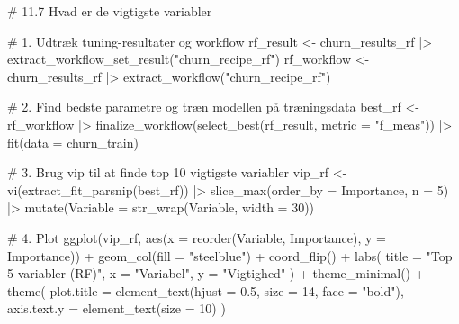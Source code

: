 \documentclass[
  11pt,
  letterpaper,
  DIV=11,
  numbers=noendperiod]{scrartcl}
\newenvironment{Shaded}{\begin{snugshade}}{\end{snugshade}}
\newcommand{\AttributeTok}[1]{\textcolor[rgb]{0.40,0.45,0.13}{#1}}
\newcommand{\CommentTok}[1]{\textcolor[rgb]{0.37,0.37,0.37}{#1}}
\newcommand{\DecValTok}[1]{\textcolor[rgb]{0.68,0.00,0.00}{#1}}
\newcommand{\FloatTok}[1]{\textcolor[rgb]{0.68,0.00,0.00}{#1}}
\newcommand{\FunctionTok}[1]{\textcolor[rgb]{0.28,0.35,0.67}{#1}}
\newcommand{\NormalTok}[1]{\textcolor[rgb]{0.00,0.23,0.31}{#1}}
\newcommand{\OtherTok}[1]{\textcolor[rgb]{0.00,0.23,0.31}{#1}}
\newcommand{\SpecialCharTok}[1]{\textcolor[rgb]{0.37,0.37,0.37}{#1}}
\newcommand{\StringTok}[1]{\textcolor[rgb]{0.13,0.47,0.30}{#1}}
\begin{document}
\begin{Shaded}
\begin{Highlighting}[]
\CommentTok{\# 11.7 Hvad er de vigtigste variabler}

\CommentTok{\# 1. Udtræk tuning{-}resultater og workflow}
\NormalTok{rf\_result }\OtherTok{\textless{}{-}}\NormalTok{ churn\_results\_rf }\SpecialCharTok{|\textgreater{}} \FunctionTok{extract\_workflow\_set\_result}\NormalTok{(}\StringTok{"churn\_recipe\_rf"}\NormalTok{)}
\NormalTok{rf\_workflow }\OtherTok{\textless{}{-}}\NormalTok{ churn\_results\_rf }\SpecialCharTok{|\textgreater{}} \FunctionTok{extract\_workflow}\NormalTok{(}\StringTok{"churn\_recipe\_rf"}\NormalTok{)}

\CommentTok{\# 2. Find bedste parametre og træn modellen på træningsdata}
\NormalTok{best\_rf }\OtherTok{\textless{}{-}}\NormalTok{ rf\_workflow }\SpecialCharTok{|\textgreater{}}
  \FunctionTok{finalize\_workflow}\NormalTok{(}\FunctionTok{select\_best}\NormalTok{(rf\_result, }\AttributeTok{metric =} \StringTok{"f\_meas"}\NormalTok{)) }\SpecialCharTok{|\textgreater{}}
  \FunctionTok{fit}\NormalTok{(}\AttributeTok{data =}\NormalTok{ churn\_train)}

\CommentTok{\# 3. Brug vip til at finde top 10 vigtigste variabler}
\NormalTok{vip\_rf }\OtherTok{\textless{}{-}} \FunctionTok{vi}\NormalTok{(}\FunctionTok{extract\_fit\_parsnip}\NormalTok{(best\_rf)) }\SpecialCharTok{|\textgreater{}}
  \FunctionTok{slice\_max}\NormalTok{(}\AttributeTok{order\_by =}\NormalTok{ Importance, }\AttributeTok{n =} \DecValTok{5}\NormalTok{) }\SpecialCharTok{|\textgreater{}}
  \FunctionTok{mutate}\NormalTok{(}\AttributeTok{Variable =} \FunctionTok{str\_wrap}\NormalTok{(Variable, }\AttributeTok{width =} \DecValTok{30}\NormalTok{))}

\CommentTok{\# 4. Plot}
\FunctionTok{ggplot}\NormalTok{(vip\_rf, }\FunctionTok{aes}\NormalTok{(}\AttributeTok{x =} \FunctionTok{reorder}\NormalTok{(Variable, Importance), }\AttributeTok{y =}\NormalTok{ Importance)) }\SpecialCharTok{+}
  \FunctionTok{geom\_col}\NormalTok{(}\AttributeTok{fill =} \StringTok{"steelblue"}\NormalTok{) }\SpecialCharTok{+}
  \FunctionTok{coord\_flip}\NormalTok{() }\SpecialCharTok{+}
  \FunctionTok{labs}\NormalTok{(}
    \AttributeTok{title =} \StringTok{"Top 5 variabler (RF)"}\NormalTok{,}
    \AttributeTok{x =} \StringTok{"Variabel"}\NormalTok{,}
    \AttributeTok{y =} \StringTok{"Vigtighed"}
\NormalTok{  ) }\SpecialCharTok{+}
  \FunctionTok{theme\_minimal}\NormalTok{() }\SpecialCharTok{+}
  \FunctionTok{theme}\NormalTok{(}
    \AttributeTok{plot.title =} \FunctionTok{element\_text}\NormalTok{(}\AttributeTok{hjust =} \FloatTok{0.5}\NormalTok{, }\AttributeTok{size =} \DecValTok{14}\NormalTok{, }\AttributeTok{face =} \StringTok{"bold"}\NormalTok{),}
    \AttributeTok{axis.text.y =} \FunctionTok{element\_text}\NormalTok{(}\AttributeTok{size =} \DecValTok{10}\NormalTok{)}
\NormalTok{  )}
\end{Highlighting}
\end{Shaded}
\end{document}
